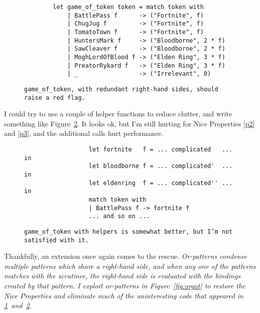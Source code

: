 \documentclass[manuscript,screen,review, 12pt, nonacm]{acmart}
\begin{document}
        \begin{figure}
            \begin{center}
                \begin{verbatim}
        let game_of_token token = match token with 
            | BattlePass f      -> ("Fortnite", f)
            | ChugJug f         -> ("Fortnite", f)
            | TomatoTown f      -> ("Fortnite", f)
            | HuntersMark f     -> ("Bloodborne", 2 * f)
            | SawCleaver f      -> ("Bloodborne", 2 * f)
            | MoghLordOfBlood f -> ("Elden Ring", 3 * f)
            | PreatorRykard f   -> ("Elden Ring", 3 * f)
            | _                 -> ("Irrelevant", 0)
                \end{verbatim}
            \end{center}    

        \caption{\tt{game\_of\_token}, with redundant right-hand sides,
        should raise a red flag.} 
        \label{fig:baregot}
        \end{figure}

        I could try to use a couple of helper functions to reduce clutter, and
        write something like Figure~\ref{fig:helpergot}. It looks ok, but I'm
        still hurting for Nice Properties \ref{p2} and \ref{p3}, and the
        additional calls hurt performance. 

        \begin{figure}
            \begin{center}
                \begin{verbatim}
                  let fortnite   f = ... complicated   ... in
                  let bloodborne f = ... complicated'  ... in
                  let eldenring  f = ... complicated'' ... in
                  match token with
                  | BattlePass f -> fortnite f
                  ... and so on ...                
                \end{verbatim}
            \end{center}    
        \caption{\tt{game\_of\_token} with helpers is somewhat better, but I'm
        not satisfied with it.} 
        \label{fig:helpergot}
        \end{figure}

        Thankfully, an extension once again comes to the rescue.
        \it{Or-patterns} condense multiple patterns which share a right-hand
        side, and when any one of the patterns matches with the scrutinee, the
        right-hand side is evaluated with the bindings created by that pattern.
        I exploit or-patterns in Figure~\ref{fig:orgot} to restore the Nice
        Properties and eliminate much of the uninteresting code that appeared in
        \ref{fig:baregot}~and~\ref{fig:helpergot}. 
\end{document}
